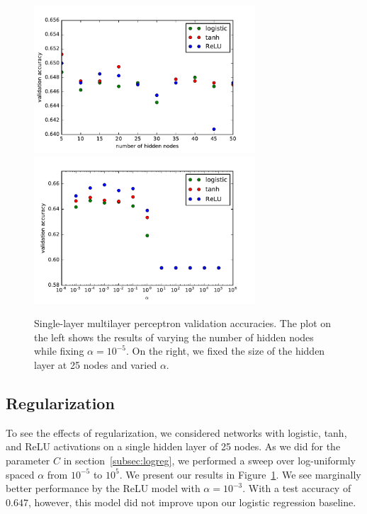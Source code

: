\documentclass{article}
\newcommand\halfwidth{3.25in}
\begin{document}
\begin{multicols}{2}
\begin{figure}[t] %
   \centering
   \includegraphics[width=\halfwidth]{img/mlp-one-hidden-layer.pdf}
   \includegraphics[width=\halfwidth]{img/mlp-alpha-experiment.pdf}
   \caption{Single-layer multilayer perceptron validation accuracies.
   The plot on the left shows the results of varying the number of hidden nodes
   while fixing $\alpha = 10^{-5}$.
   On the right, we fixed the size of the hidden layer at 25 nodes
   and varied $\alpha$.}
   \label{fig:mlp-plots}
\end{figure}


\subsection{Regularization}

To see the effects of regularization,
we considered networks with logistic, tanh, and ReLU activations
on a single hidden layer of 25 nodes.
As we did for the parameter $C$ in section~\ref{subsec:logreg},
we performed a sweep over log-uniformly spaced $\alpha$ from $10^{-5}$ to $10^5$.
We present our results in Figure~\ref{fig:mlp-plots}.
We see marginally better performance by the ReLU model with $\alpha=10^{-3}$.
With a test accuracy of $0.647$, however,
this model did not improve upon our logistic regression baseline.



\end{multicols}
\end{document}
